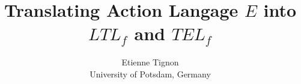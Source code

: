 \documentclass[a4paper]{article}
\begin{document}
\title{Translating Action Langage $E$ into $LTL_f$ and $TEL_f$}

\author{%
  Etienne Tignon\\
  University of Potsdam, Germany
}

\maketitle



%
%
%
%
%
%
%
%
%



\printbibliography{}
\end{document}
